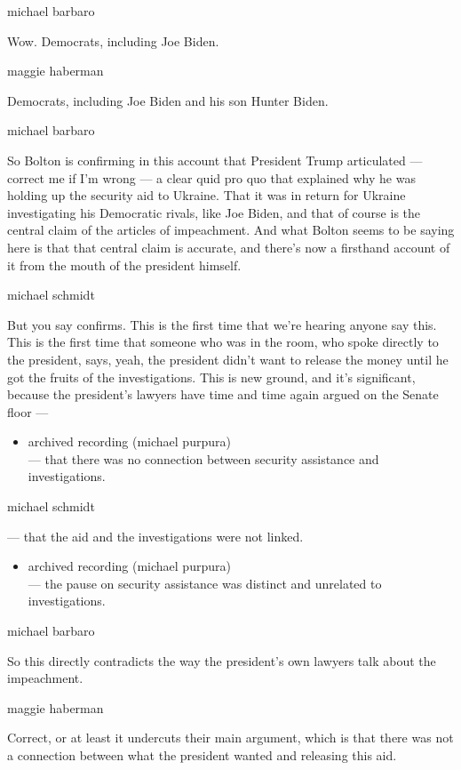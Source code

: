 michael barbaro

Wow. Democrats, including Joe Biden.

maggie haberman

Democrats, including Joe Biden and his son Hunter Biden.

michael barbaro

So Bolton is confirming in this account that President Trump articulated
--- correct me if I'm wrong --- a clear quid pro quo that explained why
he was holding up the security aid to Ukraine. That it was in return for
Ukraine investigating his Democratic rivals, like Joe Biden, and that of
course is the central claim of the articles of impeachment. And what
Bolton seems to be saying here is that that central claim is accurate,
and there's now a firsthand account of it from the mouth of the
president himself.

michael schmidt

But you say confirms. This is the first time that we're hearing anyone
say this. This is the first time that someone who was in the room, who
spoke directly to the president, says, yeah, the president didn't want
to release the money until he got the fruits of the investigations. This
is new ground, and it's significant, because the president's lawyers
have time and time again argued on the Senate floor ---

\begin{itemize}
\tightlist
\item
  archived recording (michael purpura)\\
  --- that there was no connection between security assistance and
  investigations.
\end{itemize}

michael schmidt

--- that the aid and the investigations were not linked.

\begin{itemize}
\tightlist
\item
  archived recording (michael purpura)\\
  --- the pause on security assistance was distinct and unrelated to
  investigations.
\end{itemize}

michael barbaro

So this directly contradicts the way the president's own lawyers talk
about the impeachment.

maggie haberman

Correct, or at least it undercuts their main argument, which is that
there was not a connection between what the president wanted and
releasing this aid.

